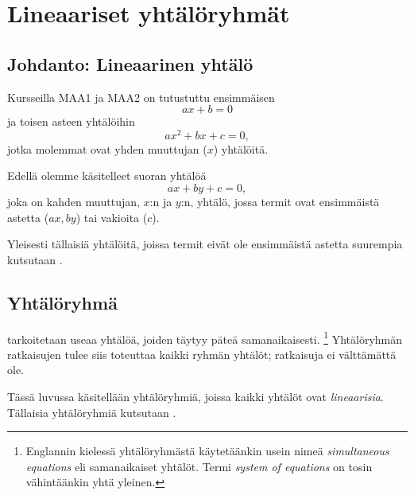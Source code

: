 \section{Lineaariset yhtälöryhmät} 


\subsection*{Johdanto: Lineaarinen yhtälö}

Kursseilla MAA1 ja MAA2 on tutustuttu ensimmäisen 
\[ax +b = 0\]
ja toisen asteen yhtälöihin
\[ax^2 + bx +c = 0,\]
jotka molemmat ovat yhden muuttujan ($x$) yhtälöitä.

Edellä olemme käsitelleet suoran yhtälöä
\[ax + by + c = 0,\]
joka on kahden muuttujan, $x$:n ja $y$:n, yhtälö, jossa termit ovat ensimmäistä astetta ($ax, by$) tai vakioita ($c$).

Yleisesti tällaisiä yhtälöitä, joissa termit eivät ole ensimmäistä astetta suurempia kutsutaan .


\subsection*{Yhtälöryhmä}

 tarkoitetaan useaa yhtälöä, joiden täytyy
päteä samanaikaisesti. \footnote{Englannin kielessä yhtälöryhmästä käytetäänkin usein nimeä 
  \emph{simultaneous equations} eli samanaikaiset yhtälöt.
  Termi \emph{system of equations} on tosin vähintäänkin yhtä yleinen.}
Yhtälöryhmän ratkaisujen tulee siis toteuttaa kaikki ryhmän yhtälöt; ratkaisuja ei välttämättä ole.

Tässä luvussa käsitellään yhtälöryhmiä, joissa kaikki yhtälöt ovat \emph{lineaarisia}. 
Tällaisia yhtälöryhmiä kutsutaan .


